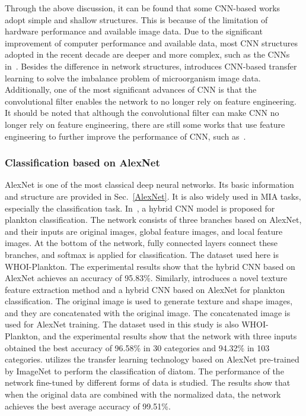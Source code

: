 Through the above discussion, it can be found that some CNN-based works~\cite{Dollfus-1999-FNNR,Beaufort-2004-ARCD,Balagurusamy-2019-DDBD} adopt simple and shallow structures. This is because of the limitation of hardware performance and available image data. Due to the significant improvement of computer performance and available data, most CNN structures adopted in the recent decade are deeper and more complex, such as the CNNs in~\cite{Yan-2017-AMEC,Luo-2018-APIA}. Besides the difference in network structures, \cite{Lee-2016-PCIL} introduces CNN-based transfer learning to solve the imbalance problem of microorganism image data. Additionally, one of the most significant advances of CNN is that the convolutional filter enables the network to no longer rely on feature engineering. It should be noted that although the convolutional filter can make CNN no longer rely on feature engineering, there are still some works that use feature engineering to further improve the performance of CNN, such as~\cite{Swetha-2020-CNNB}.


\subsubsection{Classification based on AlexNet}
AlexNet is one of the most classical deep neural networks. Its basic information and structure are provided in Sec.~\ref{AlexNet}. It is also widely used in MIA tasks, especially the classification task. In~\cite{Dai-2016-AHCN}, a hybrid CNN model is proposed for plankton classification. The network consists of three branches based on AlexNet, and their inputs are original images, global feature images, and local feature images. At the bottom of the network, fully connected layers connect these branches, and softmax is applied for classification. The dataset used here is WHOI-Plankton. The experimental results show that the hybrid CNN based on AlexNet achieves an accuracy of 95.83\%. Similarly, \cite{Cui-2018-TSIF} introduces a novel texture feature extraction method and a hybrid CNN based on AlexNet for plankton classification. The original image is used to generate texture and shape images, and they are concatenated with the original image. The concatenated image is used for AlexNet training. The dataset used in this study is also WHOI-Plankton, and the experimental results show that the network with three inputs obtained the best accuracy of 96.58\% in 30 categories and 94.32\% in 103 categories. \cite{Pedraza-2017-ADCA} utilizes the transfer learning technology based on AlexNet pre-trained by ImageNet to perform the classification of diatom. The performance of the network fine-tuned by different forms of data is studied. The results show that when the original data are combined with the normalized data, the network achieves the best average accuracy of 99.51\%.


